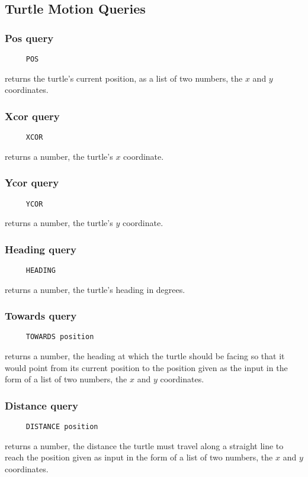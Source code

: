 \subsection{Turtle Motion Queries}

\subsubsection*{Pos query}
\begin{verbatim}
     POS
\end{verbatim}
returns the turtle's current position, as a list of two numbers, the
$x$ and $y$ coordinates.

\subsubsection*{Xcor query}
\begin{verbatim}
     XCOR
\end{verbatim}
returns a number, the turtle's $x$ coordinate.

\subsubsection*{Ycor query}
\begin{verbatim}
     YCOR
\end{verbatim}
returns a number, the turtle's $y$ coordinate.

\subsubsection*{Heading query}
\begin{verbatim}
     HEADING
\end{verbatim}
returns a number, the turtle's heading in degrees.

\subsubsection*{Towards query}
\begin{verbatim}
     TOWARDS position
\end{verbatim}
returns a number, the heading at which the turtle should be facing so
that it would point from its current position to the position given as
the input in the form of a list of two numbers, the $x$ and $y$
coordinates.

\subsubsection*{Distance query}
\begin{verbatim}
     DISTANCE position
\end{verbatim}
returns a number, the distance the turtle must travel along a straight
line to reach the position given as input in the form of a list of two
numbers, the $x$ and $y$ coordinates.


